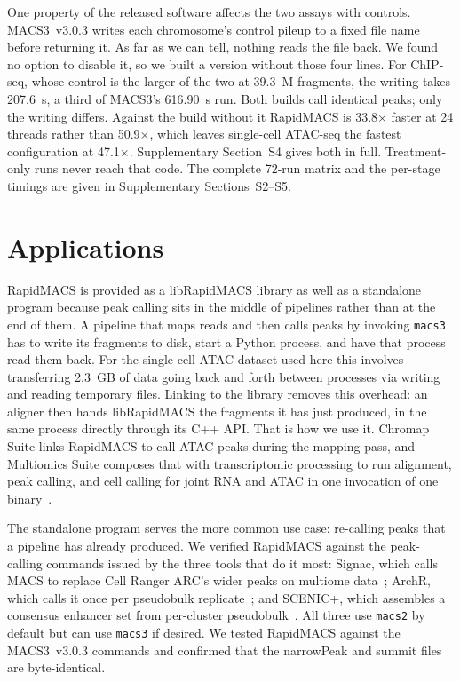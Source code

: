 \documentclass[namedate,webpdf,contemporary,large]{oup-authoring-template}
\begin{document}
One property of the released software affects the two assays with controls. MACS3~v3.0.3 writes each chromosome's control pileup to a fixed file name before returning it. As far as we can tell, nothing reads the file back. We found no option to disable it, so we built a version without those four lines. For ChIP-seq, whose control is the larger of the two at 39.3~M fragments, the writing takes 207.6~s, a third of MACS3's 616.90~s run. Both builds call identical peaks; only the writing differs. Against the build without it RapidMACS is 33.8$\times$ faster at 24 threads rather than 50.9$\times$, which leaves single-cell ATAC-seq the fastest configuration at 47.1$\times$. Supplementary Section~S4 gives both in full. Treatment-only runs never reach that code. The complete 72-run matrix and the per-stage timings are given in Supplementary Sections~S2--S5.

\section{Applications}
RapidMACS is provided as a libRapidMACS library as well as a standalone program because peak calling sits in the middle of pipelines rather than at the end of them. A pipeline that maps reads and then calls peaks by invoking \texttt{macs3} has to write its fragments to disk, start a Python process, and have that process read them back. For the single-cell ATAC dataset used here this involves transferring 2.3~GB of data going back and forth between processes via writing and reading temporary files. Linking to the library removes this overhead: an aligner then hands libRapidMACS the fragments it has just produced, in the same process directly through its C++ API. That is how we use it. Chromap Suite links RapidMACS to call ATAC peaks during the mapping pass, and Multiomics Suite composes that with transcriptomic processing to run alignment, peak calling, and cell calling for joint RNA and ATAC in one invocation of one binary~\citep{multiomicssuite}.

The standalone program serves the more common use case: re-calling peaks that a pipeline has already produced. We verified RapidMACS against the peak-calling commands issued by the three tools that do it most: Signac, which calls MACS to replace Cell Ranger ARC's wider peaks on multiome data~\citep{signac}; ArchR, which calls it once per pseudobulk replicate~\citep{archr}; and SCENIC+, which assembles a consensus enhancer set from per-cluster pseudobulk~\citep{scenicplus}. All three use \texttt{macs2} by default but can use \texttt{macs3} if desired. We tested RapidMACS against the MACS3~v3.0.3 commands and confirmed that the narrowPeak and summit files are byte-identical.
\end{document}

